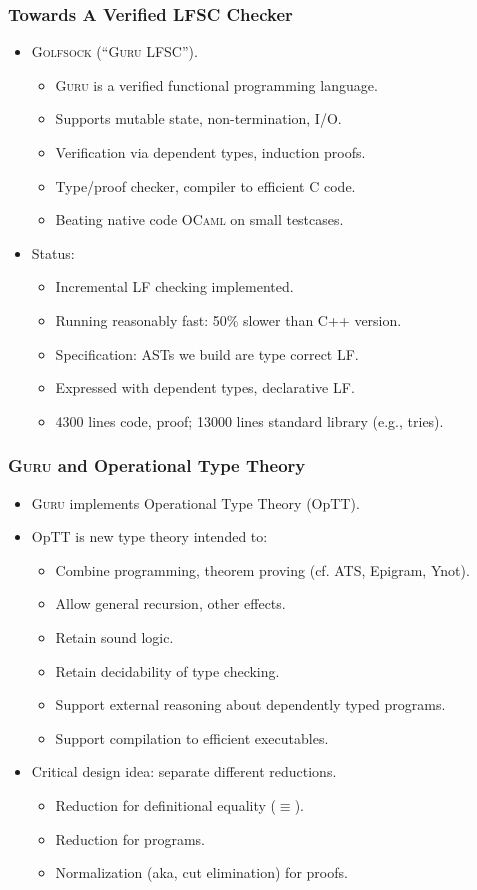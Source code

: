\documentclass[11pt]{beamer}
\begin{document}
\begin{frame}
\frametitle{Towards A Verified LFSC Checker}
\begin{itemize}
\item \textsc{Golfsock} (``\textsc{Guru} LFSC'').
\begin{itemize}
\item \textsc{Guru} is a verified functional programming language.
\item Supports mutable state, non-termination, I/O.
\item Verification via dependent types, induction proofs.
\item Type/proof checker, compiler to efficient C code.
\item Beating native code \textsc{OCaml} on small testcases.
\end{itemize}
\item Status:
\begin{itemize}
\item Incremental LF checking implemented.
\item Running reasonably fast: 50\% slower than C++ version.
\item Specification: ASTs we build are type correct LF.
\item Expressed with dependent types, declarative LF.
\item 4300 lines code, proof; 13000 lines standard library (e.g., tries).
\end{itemize}
\end{itemize}
\end{frame}

\begin{frame}
\frametitle{\textsc{Guru} and Operational Type Theory}
\begin{itemize}
\item \textsc{Guru} implements Operational Type Theory (OpTT).
\item OpTT is new type theory intended to:
\begin{itemize}
\item Combine programming, theorem proving (cf. ATS, Epigram, Ynot).
\item Allow general recursion, other effects.
\item Retain sound logic.
\item Retain decidability of type checking.
\item Support external reasoning about dependently typed programs.
\item Support compilation to efficient executables.
\end{itemize}
\item Critical design idea: separate different reductions.
\begin{itemize}
\item Reduction for definitional equality ($\equiv$).
\item Reduction for programs.
\item Normalization (aka, cut elimination) for proofs.
\end{itemize}
\end{itemize}
\end{frame}
\end{document}
